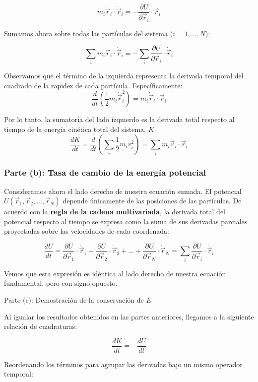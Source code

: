 \documentclass[a4paper]{article}
\begin{document}
$$ m_i \ddot{\vec{r}}_i \cdot \dot{\vec{r}}_i = -\frac{\partial U}{\partial \vec{r}_i} \cdot \dot{\vec{r}}_i $$

Sumamos ahora sobre todas las partículas del sistema ($i = 1, \dots, N$):

$$ \sum_i m_i \ddot{\vec{r}}_i \cdot \dot{\vec{r}}_i = -\sum_i \frac{\partial U}{\partial \vec{r}_i} \cdot \dot{\vec{r}}_i $$

Observamos que el término de la izquierda representa la derivada temporal del cuadrado de la rapidez de cada partícula. Específicamente:
$$ \frac{d}{dt} \left( \frac{1}{2} m_i \dot{\vec{r}}_i^2 \right) = m_i \dot{\vec{r}}_i \cdot \ddot{\vec{r}}_i $$

Por lo tanto, la sumatoria del lado izquierdo es la derivada total respecto al tiempo de la energía cinética total del sistema, $K$:
$$ \frac{dK}{dt} = \frac{d}{dt} \left( \sum_i \frac{1}{2} m_i v_i^2 \right) = \sum_i m_i \dot{\vec{r}}_i \cdot \ddot{\vec{r}}_i $$

\subsubsection*{Parte (b): Tasa de cambio de la energía potencial}

Consideramos ahora el lado derecho de nuestra ecuación sumada. El potencial $U(\vec{r}_1, \vec{r}_2, \dots, \vec{r}_N)$ depende únicamente de las posiciones de las partículas. De acuerdo con la \textbf{regla de la cadena multivariada}, la derivada total del potencial respecto al tiempo se expresa como la suma de sus derivadas parciales proyectadas sobre las velocidades de cada coordenada:

$$ \frac{dU}{dt} = \frac{\partial U}{\partial \vec{r}_1} \cdot \dot{\vec{r}}_1 + \frac{\partial U}{\partial \vec{r}_2} \cdot \dot{\vec{r}}_2 + \dots + \frac{\partial U}{\partial \vec{r}_N} \cdot \dot{\vec{r}}_N = \sum_i \frac{\partial U}{\partial \vec{r}_i} \cdot \dot{\vec{r}}_i $$

Vemos que esta expresión es idéntica al lado derecho de nuestra ecuación fundamental, pero con signo opuesto.

Parte (c): Demostración de la conservación de $E$

Al igualar los resultados obtenidos en las partes anteriores, llegamos a la siguiente relación de cuadraturas:

$$ \frac{dK}{dt} = -\frac{dU}{dt} $$

Reordenando los términos para agrupar las derivadas bajo un mismo operador temporal:
\end{document}
